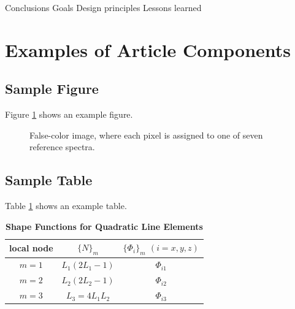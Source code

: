 \documentclass[9pt,twocolumn,twoside]{styles/osajnl}
\begin{document}
Conclusions
Goals
Design principles
Lessons learned


\section{Examples of Article Components}
\label{sec:examples}

\subsection{Sample Figure}

Figure \ref{fig:false-color} shows an example figure.

\begin{figure}[htbp]
\centering
{}
\caption{False-color image, where each pixel is assigned to one of seven reference spectra.}
\label{fig:false-color}
\end{figure}

\subsection{Sample Table}

Table \ref{tab:shape-functions} shows an example table.

\begin{table}[htbp]
\centering
\caption{\bf Shape Functions for Quadratic Line Elements}
\begin{tabular}{ccc}
\hline
local node & $\{N\}_m$ & $\{\Phi_i\}_m$ $(i=x,y,z)$ \\
\hline
$m = 1$ & $L_1(2L_1-1)$ & $\Phi_{i1}$ \\
$m = 2$ & $L_2(2L_2-1)$ & $\Phi_{i2}$ \\
$m = 3$ & $L_3=4L_1L_2$ & $\Phi_{i3}$ \\
\hline
\end{tabular}
  \label{tab:shape-functions}
\end{table}
\end{document}
